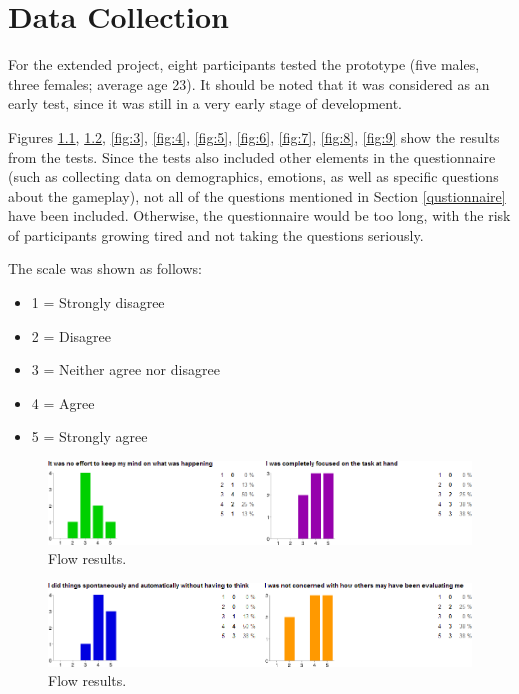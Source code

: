 \chapter{Data Collection}
For the extended project, eight participants tested the prototype (five males, three females; average age 23). It should be noted that it was considered as an early test, since it was still in a very early stage of development.

Figures \ref{fig:1}, \ref{fig:2}, \ref{fig:3}, \ref{fig:4}, \ref{fig:5}, \ref{fig:6}, \ref{fig:7}, \ref{fig:8}, \ref{fig:9} show the results from the tests. Since the tests also included other elements in the questionnaire (such as collecting data on demographics, emotions, as well as specific questions about the gameplay), not all of the questions mentioned in Section \ref{qustionnaire} have been included. Otherwise, the questionnaire would be too long, with the risk of participants growing tired and not taking the questions seriously.

The scale was shown as follows:

\begin{itemize}
\item 1 = Strongly disagree
\item 2 = Disagree
\item 3 = Neither agree nor disagree
\item 4 = Agree
\item 5 = Strongly agree
\end{itemize}

\begin{figure}[htbp]
\centering
\includegraphics[width=1.0\textwidth]{Pictures/flow_1_focus}
\caption{Flow results.}
\label{fig:1}
\end{figure}

\begin{figure}[htbp]
\centering
\includegraphics[width=1.0\textwidth]{Pictures/flow_2_social}
\caption{Flow results.}
\label{fig:2}
\end{figure}

